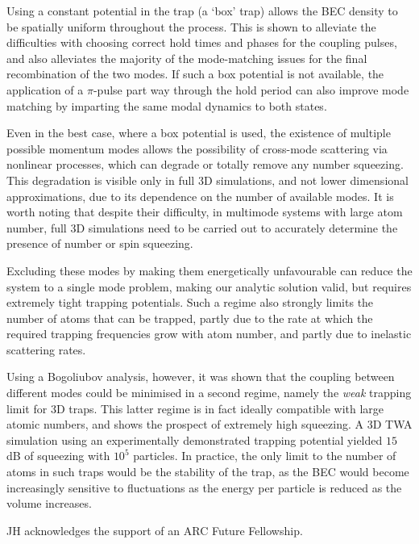 \documentclass{iopart}
\begin{document}
Using a constant potential in the trap (a `box' trap) allows the BEC density to be spatially uniform throughout the process.  This is shown to alleviate the difficulties with choosing correct hold times and phases for the coupling pulses, and also alleviates the majority of the mode-matching issues for the final recombination of the two modes. If such a box potential is not available, the application of a $\pi$-pulse part way through the hold period can also improve mode matching by imparting the same modal dynamics to both states.

Even in the best case, where a box potential is used, the existence of multiple possible momentum modes allows the possibility of cross-mode scattering via nonlinear processes, which can degrade or totally remove any number squeezing. This degradation is visible only in full 3D simulations, and not lower dimensional approximations, due to its dependence on the number of available modes. It is worth noting that despite their difficulty, in multimode systems with large atom number, full 3D simulations need to be carried out to accurately determine the presence of number or spin squeezing.

Excluding these modes by making them energetically unfavourable can reduce the system to a single mode problem, making our analytic solution valid, but requires extremely tight trapping potentials. Such a regime also strongly limits the number of atoms that can be trapped, partly due to the rate at which the required trapping frequencies grow with atom number, and partly due to inelastic scattering rates.

Using a Bogoliubov analysis, however, it was shown that the coupling between different modes could be minimised in a second regime, namely the \textit{weak} trapping limit for 3D traps. This latter regime is in fact ideally compatible with large atomic numbers, and shows the prospect of extremely high squeezing.  A 3D TWA simulation using an experimentally demonstrated trapping potential yielded $15$\,dB of squeezing with $10^5$ particles. In practice, the only limit to the number of atoms in such traps would be the stability of the trap, as the BEC would become increasingly sensitive to fluctuations as the energy per particle is reduced as the volume increases.

\ack
JH acknowledges the support of an ARC Future Fellowship.

\clearpage

\appendix
\end{document}
